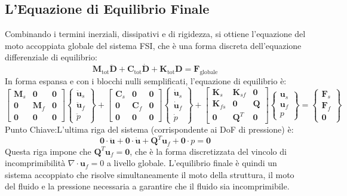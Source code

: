 \documentclass{article}
\begin{document}
\subsection{L'Equazione di Equilibrio Finale}
Combinando i termini inerziali, dissipativi e di rigidezza, si ottiene l'equazione del moto accoppiata globale del sistema FSI, che è una forma discreta dell'equazione differenziale di equilibrio:$$\mathbf{M}_{\text{tot}} \ddot{\mathbf{D}} + \mathbf{C}_{\text{tot}} \dot{\mathbf{D}} + \mathbf{K}_{\text{tot}} \mathbf{D} = \mathbf{F}_{\text{globale}}$$In forma espansa e con i blocchi nulli semplificati, l'equazione di equilibrio è:$$\begin{bmatrix}
\mathbf{M}_{s} & \mathbf{0} & \mathbf{0} \\
\mathbf{0} & \mathbf{M}_{f} & \mathbf{0} \\
\mathbf{0} & \mathbf{0} & \mathbf{0}
\end{bmatrix}
\begin{Bmatrix}
\ddot{\mathbf{u}}_s \\ \ddot{\mathbf{u}}_f \\ \ddot{p}
\end{Bmatrix}
+
\begin{bmatrix}
\mathbf{C}_{s} & \mathbf{0} & \mathbf{0} \\
\mathbf{0} & \mathbf{C}_{f} & \mathbf{0} \\
\mathbf{0} & \mathbf{0} & \mathbf{0}
\end{bmatrix}
\begin{Bmatrix}
\dot{\mathbf{u}}_s \\ \dot{\mathbf{u}}_f \\ \dot{p}
\end{Bmatrix}
+
\begin{bmatrix}
\mathbf{K}_{s} & \mathbf{K}_{sf} & \mathbf{0} \\
\mathbf{K}_{fs} & \mathbf{0} & \mathbf{Q} \\
\mathbf{0} & \mathbf{Q}^{T} & \mathbf{0}
\end{bmatrix}
\begin{Bmatrix}
\mathbf{u}_s \\ \mathbf{u}_f \\ p
\end{Bmatrix}
=
\begin{Bmatrix}
\mathbf{F}_{s} \\ \mathbf{F}_{f} \\ \mathbf{0}
\end{Bmatrix}$$Punto Chiave:L'ultima riga del sistema (corrispondente ai DoF di pressione) è:$$\mathbf{0} \cdot \ddot{\mathbf{u}} + \mathbf{0} \cdot \dot{\mathbf{u}} + \mathbf{Q}^T \mathbf{u}_f + \mathbf{0} \cdot p = \mathbf{0}$$Questa riga impone che $\mathbf{Q}^T \mathbf{u}_f = \mathbf{0}$, che è la forma discretizzata del vincolo di incomprimibilità $\nabla \cdot \mathbf{u}_f = 0$ a livello globale. L'equilibrio finale è quindi un sistema accoppiato che risolve simultaneamente il moto della struttura, il moto del fluido e la pressione necessaria a garantire che il fluido sia incomprimibile.
\end{document}
